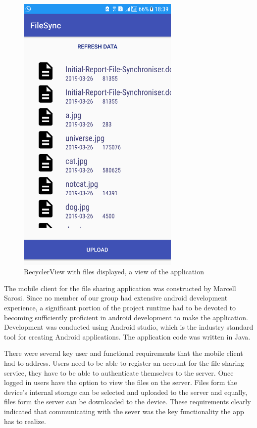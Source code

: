 \documentclass[11pt]{article}
\begin{document}
\begin{figure} [h!]
\caption{RecyclerView with files displayed, a view of the application}
\centering
\includegraphics[width=0.7\textwidth]{files.png}
\end{figure}


The mobile client for the file sharing application was constructed by Marcell Sarosi. Since no member of our group had extensive android development experience, a significant portion of the project runtime had to be devoted to becoming sufficiently proficient in android development to make the application. Development was conducted using Android studio, which is the industry standard tool for creating Android applications. The application code was written in Java.

There were several key user and functional requirements that the mobile client had to address. Users need to be able to register an account for the file sharing service, they have to be able to authenticate themselves to the server. Once logged in users have the option to view the files on the server. Files form the device’s internal storage can be selected and uploaded to the server and equally, files form the server can be downloaded to the device. These requirements clearly indicated that communicating with the sever was the key functionality the app has to realize.
\end{document}
